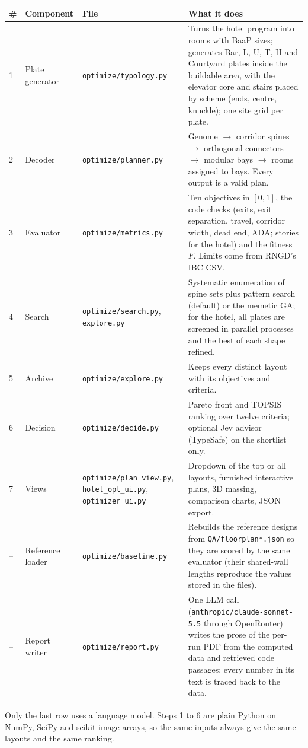 {\footnotesize\begin{longtable}{p{0.47cm}p{3.42cm}p{3.61cm}p{7.22cm}}\toprule
\textbf{\#} & \textbf{Component} & \textbf{File} & \textbf{What it does} \\ \midrule \endhead
1 & Plate generator & \texttt{optimize/typology.py} & Turns the hotel program into rooms with BaaP sizes; generates Bar, L, U, T, H and Courtyard plates inside the buildable area, with the elevator core and stairs placed by scheme (ends, centre, knuckle); one site grid per plate. \\
2 & Decoder & \texttt{optimize/planner.py} & Genome $\to$ corridor spines $\to$ orthogonal connectors $\to$ modular bays $\to$ rooms assigned to bays. Every output is a valid plan. \\
3 & Evaluator & \texttt{optimize/metrics.py} & Ten objectives in $[0,1]$, the code checks (exits, exit separation, travel, corridor width, dead end, ADA; stories for the hotel) and the fitness $F$. Limits come from RNGD's IBC CSV. \\
4 & Search & \texttt{optimize/search.py}, \texttt{explore.py} & Systematic enumeration of spine sets plus pattern search (default) or the memetic GA; for the hotel, all plates are screened in parallel processes and the best of each shape refined. \\
5 & Archive & \texttt{optimize/explore.py} & Keeps every distinct layout with its objectives and criteria. \\
6 & Decision & \texttt{optimize/decide.py} & Pareto front and TOPSIS ranking over twelve criteria; optional Jev advisor (TypeSafe) on the shortlist only. \\
7 & Views & \texttt{optimize/plan\_view.py}, \texttt{hotel\_opt\_ui.py}, \texttt{optimizer\_ui.py} & Dropdown of the top or all layouts, furnished interactive plans, 3D massing, comparison charts, JSON export. \\
-- & Reference loader & \texttt{optimize/baseline.py} & Rebuilds the reference designs from \texttt{QA/floorplan*.json} so they are scored by the same evaluator (their shared-wall lengths reproduce the values stored in the files). \\
-- & Report writer & \texttt{optimize/report.py} & One LLM call (\texttt{anthropic/claude-sonnet-5.5} through OpenRouter) writes the prose of the per-run PDF from the computed data and retrieved code passages; every number in its text is traced back to the data. \\
\bottomrule\end{longtable}}\addtocounter{table}{-1}
Only the last row uses a language model. Steps 1 to 6 are plain Python on NumPy, SciPy and scikit-image arrays, so the
same inputs always give the same layouts and the same ranking.


